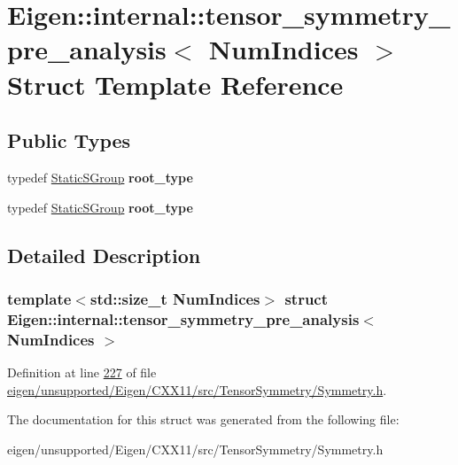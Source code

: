 \hypertarget{struct_eigen_1_1internal_1_1tensor__symmetry__pre__analysis_3_01_num_indices_01_4}{}\section{Eigen\+:\+:internal\+:\+:tensor\+\_\+symmetry\+\_\+pre\+\_\+analysis$<$ Num\+Indices $>$ Struct Template Reference}
\label{struct_eigen_1_1internal_1_1tensor__symmetry__pre__analysis_3_01_num_indices_01_4}
\subsection*{Public Types}
\begin{DoxyCompactItemize}
\item 
\mbox{\label{struct_eigen_1_1internal_1_1tensor__symmetry__pre__analysis_3_01_num_indices_01_4_a30864710fcb0ab21ade78629bf00196f}} 
typedef \hyperlink{class_eigen_1_1_static_s_group}{Static\+S\+Group} {\bfseries root\+\_\+type}
\item 
\mbox{\label{struct_eigen_1_1internal_1_1tensor__symmetry__pre__analysis_3_01_num_indices_01_4_a30864710fcb0ab21ade78629bf00196f}} 
typedef \hyperlink{class_eigen_1_1_static_s_group}{Static\+S\+Group} {\bfseries root\+\_\+type}
\end{DoxyCompactItemize}


\subsection{Detailed Description}
\subsubsection*{template$<$std\+::size\+\_\+t Num\+Indices$>$\newline
struct Eigen\+::internal\+::tensor\+\_\+symmetry\+\_\+pre\+\_\+analysis$<$ Num\+Indices $>$}



Definition at line \hyperlink{eigen_2unsupported_2_eigen_2_c_x_x11_2src_2_tensor_symmetry_2_symmetry_8h_source_l00227}{227} of file \hyperlink{eigen_2unsupported_2_eigen_2_c_x_x11_2src_2_tensor_symmetry_2_symmetry_8h_source}{eigen/unsupported/\+Eigen/\+C\+X\+X11/src/\+Tensor\+Symmetry/\+Symmetry.\+h}.



The documentation for this struct was generated from the following file\+:\begin{DoxyCompactItemize}
\item 
eigen/unsupported/\+Eigen/\+C\+X\+X11/src/\+Tensor\+Symmetry/\+Symmetry.\+h\end{DoxyCompactItemize}
